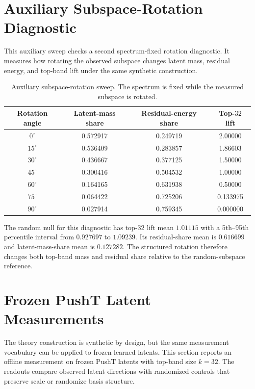 \documentclass{article}
\begin{document}
\section{Auxiliary Subspace-Rotation Diagnostic}
\label{sec:supp-auxiliary}

This auxiliary sweep checks a second spectrum-fixed rotation diagnostic. It measures how rotating the observed subspace changes latent mass, residual energy, and top-band lift under the same synthetic construction.

\begin{table}[H]
\centering
\caption{Auxiliary subspace-rotation sweep. The spectrum is fixed while the measured subspace is rotated.}
\label{tab:supp-control}
\begin{tabular}{cccc}
\toprule
Rotation angle & Latent-mass share & Residual-energy share & Top-$32$ lift \\
\midrule
$0^\circ$ & 0.572917 & 0.249719 & 2.00000 \\
$15^\circ$ & 0.536409 & 0.283857 & 1.86603 \\
$30^\circ$ & 0.436667 & 0.377125 & 1.50000 \\
$45^\circ$ & 0.300416 & 0.504532 & 1.00000 \\
$60^\circ$ & 0.164165 & 0.631938 & 0.50000 \\
$75^\circ$ & 0.064422 & 0.725206 & 0.133975 \\
$90^\circ$ & 0.027914 & 0.759345 & 0.000000 \\
\bottomrule
\end{tabular}
\end{table}

The random null for this diagnostic has top-$32$ lift mean $1.01115$ with a 5th--95th percentile interval from $0.927697$ to $1.09239$. Its residual-share mean is $0.616699$ and latent-mass-share mean is $0.127282$. The structured rotation therefore changes both top-band mass and residual share relative to the random-subspace reference.

\section{Frozen PushT Latent Measurements}
\label{sec:supp-frozen-pusht}

The theory construction is synthetic by design, but the same measurement vocabulary can be applied to frozen learned latents. This section reports an offline measurement on frozen PushT latents with top-band size $k=32$. The readouts compare observed latent directions with randomized controls that preserve scale or randomize basis structure.
\end{document}
